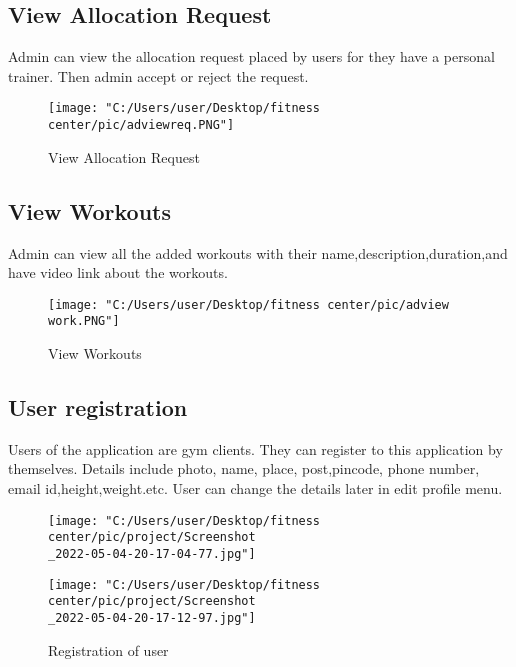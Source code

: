 \documentclass[a4paper,12pt,toc=flat]{report}
\begin{document}
{{ \subsection {View Allocation Request}
 Admin can view the allocation request placed by  users for  they have a personal trainer. Then admin accept or reject the request.

 \begin{figure}[bph]
 	\centering
 	\texttt{[image: "C:/Users/user/Desktop/fitness center/pic/adviewreq.PNG"]} 
 	\caption{View Allocation Request} 
 	\label{u1}
 \end{figure}
 
 \subsection {View Workouts}
 Admin can view all the added workouts with their name,description,duration,and have video link about the workouts.
 
 \begin{figure}[bph]
 	\centering
 	\texttt{[image: "C:/Users/user/Desktop/fitness center/pic/adview work.PNG"]} 
 	\caption{View Workouts } 
 	\label{u1}
 \end{figure}
 \newpage
 
 \subsection {User registration}
 Users of the application are gym clients. They can register to this application by themselves. Details include photo, name, place, post,pincode, phone number, email id,height,weight.etc. User can change the details later in edit profile menu.
 
 \begin{figure}[!ht]
	\begin{minipage}{0.45\linewidth}
		\texttt{[image: "C:/Users/user/Desktop/fitness center/pic/project/Screenshot\\\_2022-05-04-20-17-04-77.jpg"]}
	
	\end{minipage}
	\hfill
	\begin{minipage}{0.4\linewidth}
		\texttt{[image: "C:/Users/user/Desktop/fitness center/pic/project/Screenshot\\\_2022-05-04-20-17-12-97.jpg"]}
	
	\end{minipage}
	\caption{Registration of user}
\end{figure}
 	
}}
\end{document}
